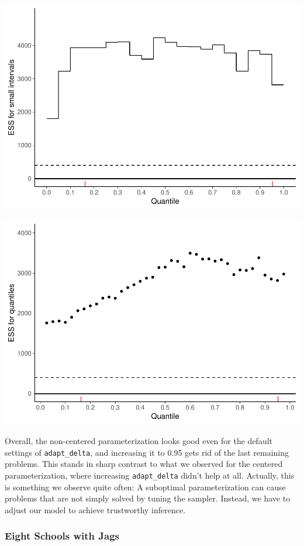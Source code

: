 \documentclass[american,]{article}
\begin{document}
\includegraphics{graphics/local-ess-fit-ncp-tau-1.pdf}

\includegraphics{graphics/quantile-ess-fit-ncp-tau-1.pdf}

Overall, the non-centered parameterization looks good even for the
default settings of \texttt{adapt\_delta}, and increasing it to 0.95
gets rid of the last remaining problems. This stands in sharp contrast
to what we observed for the centered parameterization, where increasing
\texttt{adapt\_delta} didn't help at all. Actually, this is something we
observe quite often: A suboptimal parameterization can cause problems
that are not simply solved by tuning the sampler. Instead, we have to
adjust our model to achieve trustworthy inference.

\hypertarget{eight-schools-with-jags}{%
\subsubsection*{Eight Schools with Jags}\label{eight-schools-with-jags}}
\end{document}
